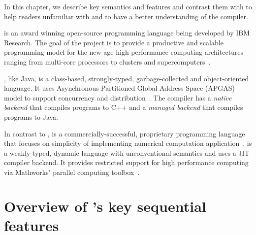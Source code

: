
In this chapter, we describe key \xten semantics and features and contrast 
them with \matlab to help readers unfamiliar with \xten and \matlab to
have a better understanding of the \mixten compiler.   

\xten is an award winning open-source programming language being developed by
IBM Research. The goal of the \xten project is to provide a productive and
scalable programming model for the new-age high performance computing
architectures ranging from multi-core processors to clusters and
supercomputers~\cite{x10}. 

\xten, like Java, is a class-based, strongly-typed, garbage-collected and
object-oriented language. It uses Asynchronous Partitioned Global Address 
Space (APGAS)
model to support concurrency and distribution~\cite{specs}. The \xten compiler has a
\emph{native backend} that compiles \xten programs to C++ and a 
\emph{managed backend} that
compiles \xten programs to Java. 

In contrast to \xten, \matlab is a commercially-successful, proprietary
programming language that focuses on simplicity of implementing numerical
computation application~\cite{MatlabGrowth}. \matlab is a weakly-typed, dynamic language
with unconventional semantics and uses a JIT compiler backend.
It provides restricted support for high performance
computing via Mathworks' parallel computing toolbox~\cite{pct}. 

\section{Overview of \xten's key sequential features}

